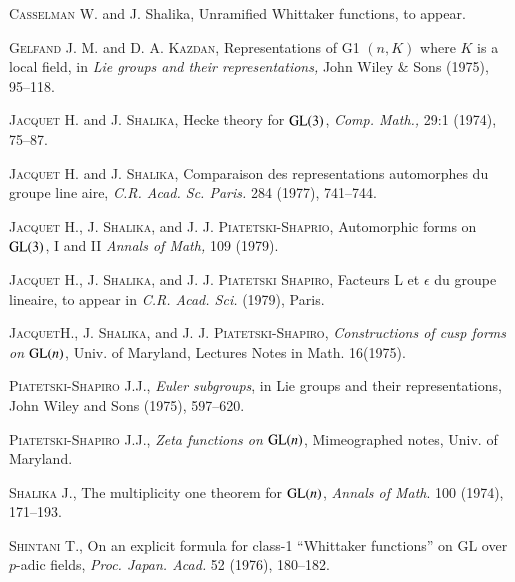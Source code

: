 \begin{thebibliography}{99}
 \textsc{Casselman} W. and J. Shalika, Unramified Whittaker functions, to appear.

 \textsc{Gelfand} J. M. and D. A. \textsc{Kazdan}, Representations of G1 $(n, K)$ where $K$ is a local field, in {\em Lie groups and their representations,} John Wiley \& Sons (1975), 95--118.

 \textsc{Jacquet} H. and J. \textsc{Shalika}, Hecke theory for $\mathrm{GL}(3)$, {\em Comp. Math.,} 29:1 (1974), 75--87.

 \textsc{Jacquet} H. and J. \textsc{Shalika}, Comparaison des representations automorphes du groupe line aire, {\em C.R. Acad. Sc. Paris.} 284 (1977), 741--744.

 \textsc{Jacquet} H., J. \textsc{Shalika}, and J. J. \textsc{Piatetski-Shaprio}, Automorphic forms on $\mathrm{GL}(3)$, I and II {\em Annals of Math,} 109 (1979).

 \textsc{Jacquet} H., J. \textsc{Shalika}, and J. J. \textsc{Piatetski Shapiro}, Facteurs L et $\epsilon$ du groupe lineaire, to appear in {\em C.R. Acad. Sci.} (1979), Paris.

 \textsc{Jacquet}\pageoriginale H., J. \textsc{Shalika}, and J. J. \textsc{Piatetski-Shapiro}, {\em Constructions of cusp forms on} $\mathrm{GL}(n)$, Univ. of Maryland, Lectures Notes in Math. 16(1975).

 \textsc{Piatetski-Shapiro} J.J., {\em Euler subgroups}, in Lie groups and their representations, John Wiley and Sons (1975), 597--620.

 \textsc{Piatetski-Shapiro} J.J., {\em Zeta functions on} $\mathrm{GL}(n)$, Mimeographed notes, Univ. of Maryland.

 \textsc{Shalika J.,} The multiplicity one theorem for $\mathrm{GL}(n)$, {\em Annals of Math}. 100 (1974), 171--193.

 \textsc{Shintani} T., On an explicit formula for class-1 ``Whittaker functions'' on GL over $p$-adic fields, {\em Proc. Japan. Acad.} 52 (1976), 180--182.
\end{thebibliography}


